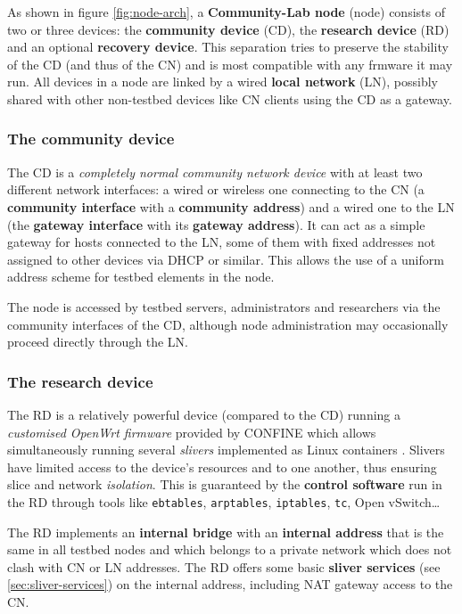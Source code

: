\documentclass[conference]{IEEEtran}
\begin{document}
As shown in figure \ref{fig:node-arch}, a \textbf{Community-Lab node} (node)
consists of two or three devices: the \textbf{community device} (CD), the
\textbf{research device} (RD) and an optional \textbf{recovery device}.  This
separation tries to preserve the stability of the CD (and thus of the CN) and
is most compatible with any frmware it may run.  All devices in a node are
linked by a wired \textbf{local network} (LN), possibly shared with other
non-testbed devices like CN clients using the CD as a gateway.

\subsubsection{The community device}

The CD is a \emph{completely normal community network device} with at least
two different network interfaces: a wired or wireless one connecting to the CN
(a \textbf{community interface} with a \textbf{community address}) and a wired
one to the LN (the \textbf{gateway interface} with its \textbf{gateway
  address}).  It can act as a simple gateway for hosts connected to the LN,
some of them with fixed addresses not assigned to other devices via DHCP or
similar.  This allows the use of a uniform address scheme for testbed elements
in the node.

The node is accessed by testbed servers, administrators and researchers via
the community interfaces of the CD, although node administration may
occasionally proceed directly through the LN.

\subsubsection{The research device}

The RD is a relatively powerful device (compared to the CD) running a
\emph{customised OpenWrt firmware} provided by CONFINE which allows simultaneously running
several \emph{slivers} implemented as Linux containers \cite{lxc}.
Slivers have limited access to the device's resources and to one another, thus
ensuring slice and network \emph{isolation}.  This is guaranteed by the
\textbf{control software} run in the RD through tools like \texttt{ebtables},
\texttt{arptables}, \texttt{iptables}, \texttt{tc}, Open vSwitch…


The RD implements an \textbf{internal bridge} with an \textbf{internal
  address} that is the same in all testbed nodes and which belongs to a
private network which does not clash with CN or LN addresses.  The RD offers
some basic \textbf{sliver services} (see \ref{sec:sliver-services}) on the
internal address, including NAT gateway access to the CN.
\end{document}
